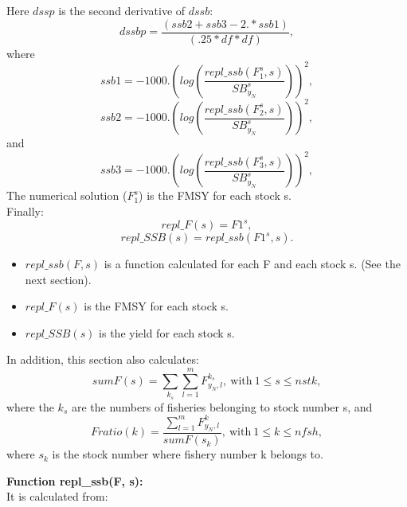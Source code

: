 \documentclass{article}
\begin{document}
Here $dssp$ is the second derivative of $dssb$:
\begin{equation}
    dssbp  = \dfrac{(ssb2 + ssb3 - 2.*ssb1)}{(.25*df*df)},
\end{equation}
where
\begin{equation}
    ssb1=-1000.\left(log\left(\dfrac{repl\_ssb(F_1^s,s)}{SB^s_{y_N}}\right)\right)^2,
\end{equation}
\begin{equation}
    ssb2=-1000.\left(log\left(\dfrac{repl\_ssb(F_2^s,s)}{SB^s_{y_N}}\right)\right)^2,
\end{equation}
and
\begin{equation}
    ssb3=-1000.\left(log\left(\dfrac{repl\_ssb(F_3^s,s)}{SB^s_{y_N}}\right)\right)^2,
\end{equation}
The numerical solution ($F_1^s$) is the  FMSY for each stock s.\\
Finally:
\begin{equation}
    repl\_F(s) = F1^s,
\end{equation}
\begin{equation}
    repl\_SSB(s) = repl\_ssb(F1^s,s).
\end{equation}
\begin{itemize}
    \item $repl\_ssb(F,s)$ is a function calculated for each F and each stock s. (See the next section).
    \item $repl\_F(s)$ is the FMSY for each stock s.
    \item $repl\_SSB(s)$ is the yield for each stock s.
\end{itemize}

In addition, this section also calculates:
\begin{equation}
    sumF(s)=\sum_{k_s}\sum_{l=1}^m F^{k_s}_{y_N,l}, \  \text{with} \ 1\leq s \leq nstk,
\end{equation}
where the $k_s$ are the numbers of fisheries belonging to stock number s, and
\begin{equation}
    Fratio(k)=\dfrac{\sum_{l=1}^mF^k_{y_N,l}}{sumF(s_k)}, \  \text{with} \ 1\leq k  \leq nfsh,
\end{equation}
where $s_k$ is the stock number where fishery number k belongs to.

\textbf{Function repl\_ssb(F, s):}\\
It is calculated from:
\end{document}
